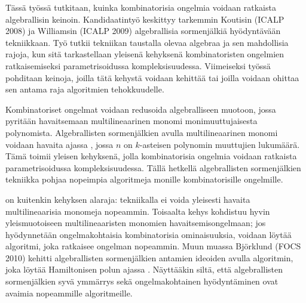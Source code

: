 %
%

\begin{fiabstract}
  Tässä työssä tutkitaan, kuinka kombinatorisia ongelmia voidaan 
  ratkaista %
  algebrallisin keinoin. Kandidaatintyö keskittyy tarkemmin 
  Koutisin (ICALP 2008) ja Williamsin (ICALP 2009) algebrallisia sormenjälkiä 
  hyödyntävään tekniikkaan. 
  Työ tutkii tekniikan taustalla olevaa algebraa ja sen mahdollisia rajoja,  
  kun sitä tarkastellaan yleisenä kehyksenä kombinatoristen ongelmien ratkaisemiseksi 
  parametrisoidussa kompleksisuudessa. 
  Viimeiseksi työssä pohditaan keinoja, joilla tätä kehystä voidaan kehittää tai joilla 
  voidaan ohittaa sen antama raja algoritmien tehokkuudelle. 

  Kombinatoriset ongelmat voidaan redusoida algebralliseen muotoon, jossa 
  pyritään havaitsemaan multilineaarinen monomi monimuuttujaisesta polynomista. 
  Algebrallisten sormenjälkien avulla multilineaarinen monomi 
  voidaan havaita ajassa , 
  jossa $n$ on $k$-asteisen polynomin muuttujien lukumäärä. 
  Tämä toimii yleisen kehyksenä, 
  jolla kombinatorisia ongelmia voidaan ratkaista parametrisoidussa kompleksisuudessa. 
  Tällä hetkellä algebrallisten sormenjälkien 
  tekniikka pohjaa nopeimpia algoritmeja monille 
  kombinatorisille ongelmille.

   on kuitenkin 
  kehyksen alaraja: tekniikalla ei voida yleisesti havaita multilineaarisia monomeja nopeammin. Toisaalta 
  kehys kohdistuu hyvin yleismuotoiseen multilineaaristen monomien havaitsemisongelmaan; 
  jos hyödynnetään ongelmakohtaisia kombinatorisia ominaisuuksia, 
  voidaan löytää algoritmi, joka ratkaisee ongelman nopeammin. 
  Muun muassa Björklund (FOCS 2010) kehitti 
  algebrallisten sormenjälkien antamien ideoiden avulla algoritmin, joka 
  löytää Hamiltonisen polun ajassa . 
  Näyttääkin siltä, että algebrallisten sormenjälkien syvä ymmärrys sekä ongelmakohtainen 
  hyödyntäminen ovat avaimia nopeammille algoritmeille.
%

\end{fiabstract}
